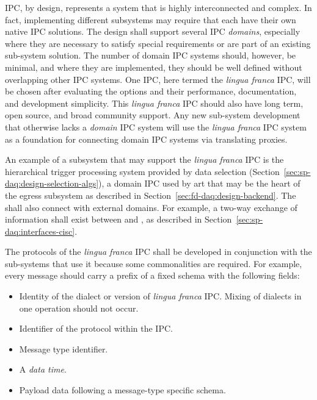 IPC, by design, represents a system that is highly interconnected and complex. 
In fact, implementing  different  subsystems may require that each have their own native IPC solutions. 
The  design shall support several IPC \textit{domains}, especially where they are necessary to satisfy special requirements or are part of an existing sub-system solution. 
The number of domain IPC systems should, however, be minimal, and where they are implemented, they should be well defined without overlapping other IPC systems. 
One IPC, here termed the \textit{lingua franca} IPC, will be chosen after evaluating the options and their performance, documentation, and development simplicity. This \textit{lingua franca} IPC should also have long term, open source, and broad community support. 
Any new sub-system development that otherwise lacks a \textit{domain} IPC system will use the \textit{lingua franca} IPC system as a foundation for connecting domain IPC systems via translating proxies.

An example of a subsystem that may support the \textit{lingua franca} IPC is the hierarchical trigger processing system provided by data selection (Section~\ref{sec:sp-daq:design-selection-algs}), 
a domain IPC used by art that may be the heart of the egress subsystem as described in Section~\ref{sec:fd-daq:design-backend}.
The  shall also connect with external domains. 
For example, a two-way exchange of information shall exist between  and , as described in Section~\ref{sec:sp-daq:interfaces-cisc}.  

The protocols of the \textit{lingua franca} IPC shall be developed in conjunction with the  sub-systems that use it because some commonalities are required. For example,
every message should carry a prefix of a fixed schema with the following fields:

\begin{itemize}
\item Identity of the dialect or version of \textit{lingua franca} IPC.  Mixing of dialects in one operation should not occur.
\item Identifier of the protocol within the IPC.
\item Message type identifier.
\item A \textit{data time}.
\item Payload data following a message-type specific schema.
\end{itemize}

